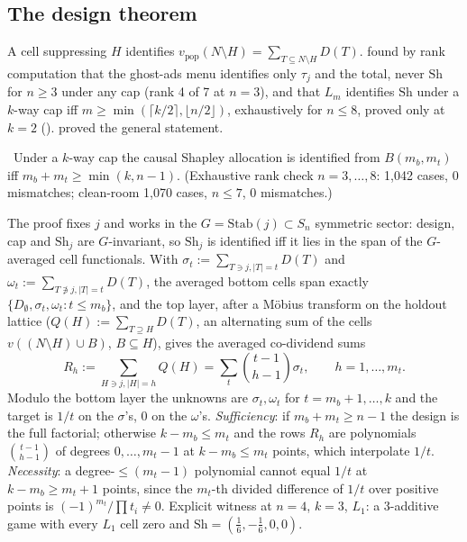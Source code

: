 \subsection{The design theorem}

A cell suppressing $H$ identifies $v_{\mathrm{pop}}(N \setminus H) = \sum_{T \subseteq N \setminus H} D(T)$.  found by rank computation that the ghost-ads menu identifies only $\tau_j$ and the total, never $\mathrm{Sh}$ for $n \ge 3$ under any cap (rank 4 of 7 at $n = 3$), and that $L_m$ identifies $\mathrm{Sh}$ under a $k$-way cap iff $m \ge \min(\lceil k/2 \rceil, \lfloor n/2 \rfloor)$, exhaustively for $n \le 8$, proved only at $k = 2$ ().  proved the general statement.

\begin{theorem}
\label{attr:thm:design}
\tagEstablished\ Under a $k$-way cap the causal Shapley allocation is identified from $B(m_b, m_t)$ iff $m_b + m_t \ge \min(k, n-1)$. (Exhaustive rank check $n = 3, \ldots, 8$: 1,042 cases, 0 mismatches; clean-room 1,070 cases, $n \le 7$, 0 mismatches.)
\end{theorem}

The proof fixes $j$ and works in the $G = \mathrm{Stab}(j) \subset S_n$ symmetric sector: design, cap and $\mathrm{Sh}_j$ are $G$-invariant, so $\mathrm{Sh}_j$ is identified iff it lies in the span of the $G$-averaged cell functionals. With $\sigma_t := \sum_{T \ni j, |T| = t} D(T)$ and $\omega_t := \sum_{T \not\ni j, |T| = t} D(T)$, the averaged bottom cells span exactly $\{D_\emptyset, \sigma_t, \omega_t : t \le m_b\}$, and the top layer, after a M\"obius transform on the holdout lattice ($Q(H) := \sum_{T \supseteq H} D(T)$, an alternating sum of the cells $v((N \setminus H) \cup B)$, $B \subseteq H$), gives the averaged co-dividend sums
\begin{equation}
R_h := \sum_{H \ni j, |H| = h} Q(H) = \sum_t \binom{t-1}{h-1}\sigma_t, \qquad h = 1, \ldots, m_t.
\label{eq:attr:Rh}
\end{equation}
Modulo the bottom layer the unknowns are $\sigma_t, \omega_t$ for $t = m_b + 1, \ldots, k$ and the target is $1/t$ on the $\sigma$'s, 0 on the $\omega$'s. \emph{Sufficiency}: if $m_b + m_t \ge n - 1$ the design is the full factorial; otherwise $k - m_b \le m_t$ and the rows $R_h$ are polynomials $\binom{t-1}{h-1}$ of degrees $0, \ldots, m_t - 1$ at $k - m_b \le m_t$ points, which interpolate $1/t$. \emph{Necessity}: a degree-$\le(m_t - 1)$ polynomial cannot equal $1/t$ at $k - m_b \ge m_t + 1$ points, since the $m_t$-th divided difference of $1/t$ over positive points is $(-1)^{m_t}/\prod t_i \ne 0$. Explicit witness at $n = 4$, $k = 3$, $L_1$: a 3-additive game with every $L_1$ cell zero and $\mathrm{Sh} = (\tfrac16, -\tfrac16, 0, 0)$.

